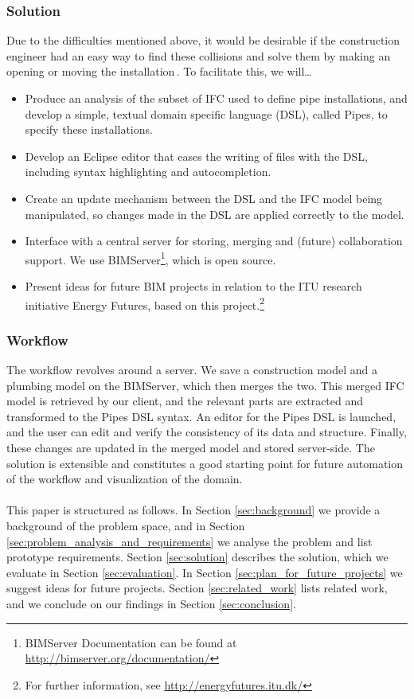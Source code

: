 \subsubsection{Solution}
Due to the difficulties mentioned above, it would be desirable if the construction engineer had an easy way to find these collisions and solve them by making an opening or moving the installation\,\cite{jorgensen12}. To facilitate this, we will…
\begin{itemize}
\item Produce an analysis of the subset of IFC used to define pipe installations, and develop a simple, textual domain specific language (DSL), called Pipes, to specify these installations.
\item Develop an Eclipse editor that eases the writing of files with the DSL, including syntax highlighting and autocompletion.
\item Create an update mechanism between the DSL and the IFC model being manipulated, so changes made in the DSL are applied correctly to the model.
\item Interface with a central server for storing, merging and (future) collaboration support. We use BIMServer\footnote{BIMServer Documentation can be found at \url{http://bimserver.org/documentation/}}, which is open source.
\item Present ideas for future BIM projects in relation to the ITU research initiative Energy Futures, based on this project.\footnote{For further information, see \url{http://energyfutures.itu.dk/}}
\end{itemize}

\subsubsection{Workflow}
\label{sec:workflow}
The workflow revolves around a server. We save a construction model and a plumbing model on the BIMServer, which then merges the two. This merged IFC model is retrieved by our client, and the relevant parts are extracted and transformed to the Pipes DSL syntax. An editor for the Pipes DSL is launched, and the user can edit and verify the consistency of its data and structure. Finally, these changes are updated in the merged model and stored server-side. The solution is extensible and constitutes a good starting point for future automation of the workflow and visualization of the domain.

\paragraph{}
This paper is structured as follows. In Section \ref{sec:background} we provide a background of the problem space, and in Section \ref{sec:problem_analysis_and_requirements} we analyse the problem and list prototype requirements. Section \ref{sec:solution} describes the solution, which we evaluate in Section \ref{sec:evaluation}. In Section \ref{sec:plan_for_future_projects} we suggest ideas for future projects. Section \ref{sec:related_work} lists related work, and we conclude on our findings in Section \ref{sec:conclusion}.
